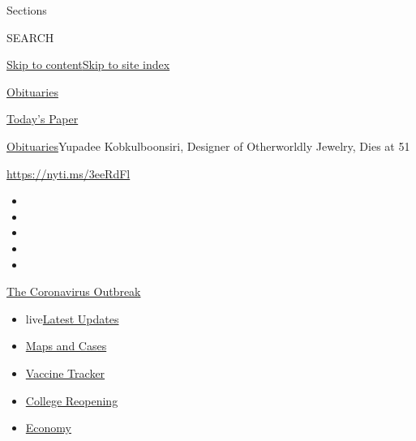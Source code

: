 Sections

SEARCH

\protect\hyperlink{site-content}{Skip to
content}\protect\hyperlink{site-index}{Skip to site index}

\href{https://www.nytimes.com/section/obituaries}{Obituaries}

\href{https://myaccount.nytimes.com/auth/login?response_type=cookie\&client_id=vi}{}

\href{https://www.nytimes.com/section/todayspaper}{Today's Paper}

\href{/section/obituaries}{Obituaries}\textbar{}Yupadee Kobkulboonsiri,
Designer of Otherworldly Jewelry, Dies at 51

\url{https://nyti.ms/3eeRdFl}

\begin{itemize}
\item
\item
\item
\item
\item
\end{itemize}

\href{https://www.nytimes.com/news-event/coronavirus?action=click\&pgtype=Article\&state=default\&region=TOP_BANNER\&context=storylines_menu}{The
Coronavirus Outbreak}

\begin{itemize}
\tightlist
\item
  live\href{https://www.nytimes.com/2020/08/03/world/coronavirus-covid-19.html?action=click\&pgtype=Article\&state=default\&region=TOP_BANNER\&context=storylines_menu}{Latest
  Updates}
\item
  \href{https://www.nytimes.com/interactive/2020/us/coronavirus-us-cases.html?action=click\&pgtype=Article\&state=default\&region=TOP_BANNER\&context=storylines_menu}{Maps
  and Cases}
\item
  \href{https://www.nytimes.com/interactive/2020/science/coronavirus-vaccine-tracker.html?action=click\&pgtype=Article\&state=default\&region=TOP_BANNER\&context=storylines_menu}{Vaccine
  Tracker}
\item
  \href{https://www.nytimes.com/2020/08/02/us/covid-college-reopening.html?action=click\&pgtype=Article\&state=default\&region=TOP_BANNER\&context=storylines_menu}{College
  Reopening}
\item
  \href{https://www.nytimes.com/live/2020/08/03/business/stock-market-today-coronavirus?action=click\&pgtype=Article\&state=default\&region=TOP_BANNER\&context=storylines_menu}{Economy}
\end{itemize}

